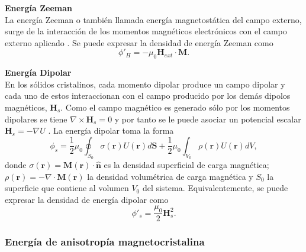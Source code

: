 \vspace{10pt}

\textbf{Energía Zeeman}\\
La energía Zeeman o también llamada energía magnetostática del campo externo, surge de la interacción de los momentos magnéticos electrónicos con el campo externo aplicado \cite{Exl2020}. Se puede expresar la densidad de energía Zeeman como \[ \phi'_H = - \mu_0 \bm{H}_{ext} \cdot \bm{M}.\]

\textbf{Energía Dipolar}\\
En los sólidos cristalinos, cada momento dipolar produce un campo dipolar y cada uno de estos interaccionan con el campo producido por los demás dipolos magnéticos, $\bm{H}_s$. Como el campo magnético es generado sólo por los momentos dipolares se tiene $\nabla \times \bm{H}_s = 0$ y por tanto se le puede asociar un potencial escalar $\bm{H}_s = - \nabla U$ \cite{KronmüllerMicromagnetism}. La energía dipolar toma la forma \[ \phi_s = \frac{1}{2} \mu_0 \oint_{S_0} \sigma(\bm{r}) U(\bm{r}) d \bm{S} + \frac{1}{2} \mu_0 \int_{V_0} \rho (\bm{r}) U(\bm{r}) dV ,\] donde $\sigma(\bm{r}) = \bm{M} (\bm{r}) \cdot \hat{\bm{n}}$ es la densidad superficial de carga magnética; $\rho(\bm{r}) = - \nabla \cdot \bm{M} (\bm{r})$ la densidad volumétrica de carga magnética y $S_0$ la superficie que contiene al volumen $V_0$ del sistema. Equivalentemente, se puede expresar la densidad de energía dipolar como \[ \phi'_s = \frac{\mu_0}{2} \bm{H}_s^2 .\]

\subsubsection{Energía de anisotropía magnetocristalina}


